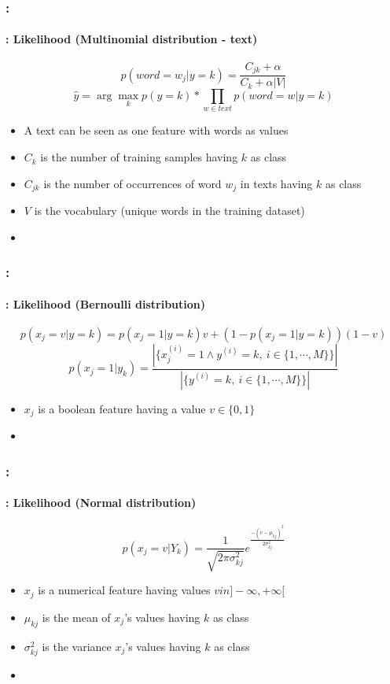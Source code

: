 \documentclass[xcolor=table]{beamer}
\begin{document}
\begin{frame}
	\frametitle{\insertshortsubtitle: \insertsection}
	\framesubtitle{\insertsubsection: Likelihood (Multinomial distribution - text)}
	
	\[p(word = w_j|y=k) = \frac{C_{jk} + \alpha}{C_k + \alpha |V|}\]
	\[\hat{y} = \arg\max_{k} p(y=k) * \prod_{w \in text} p(word = w|y=k)\]
	
	\begin{itemize}
		\item A text can be seen as one feature with words as values
		\item $C_k$ is the number of training samples having $k$ as class
		\item $C_{jk}$ is the number of occurrences of word $w_j$ in texts having $k$ as class
		\item $V$ is the vocabulary (unique words in the training dataset)
		\item {}
	\end{itemize}
	
\end{frame}

\begin{frame}
	\frametitle{\insertshortsubtitle: \insertsection}
	\framesubtitle{\insertsubsection: Likelihood (Bernoulli distribution)}
	
	\[p(x_j=v|y=k) = p(x_j=1|y=k) v + (1-p(x_j=1|y=k)) (1-v)\]
	\[p(x_j=1|y_k) = \frac{|\{x_j^{(i)} = 1 \wedge y^{(i)} = k,\ i \in \{1, \cdots, M\}\}|}{|\{y^{(i)} = k,\ i \in \{1, \cdots, M\}\}|}\]
	
	\begin{itemize}
		\item $x_j$ is a boolean feature having a value $v \in \{0, 1\}$
		\item {}
	\end{itemize}
	
	
\end{frame}

\begin{frame}
	\frametitle{\insertshortsubtitle: \insertsection}
	\framesubtitle{\insertsubsection: Likelihood (Normal distribution)}
	
	\[p(x_j = v|Y_k) = \frac{1}{\sqrt{2\pi \sigma_{kj}^2}} e^\frac{-(v-\mu_{kj})^2}{2 \sigma_{kj}^2}\]
	
	\begin{itemize}
		\item $x_j$ is a numerical feature having values $ v in ]-\infty, +\infty[ $
		\item $\mu_{kj}$ is the mean of $x_j$'s values having $k$ as class
		\item $\sigma_{kj}^2$ is the variance $x_j$'s values having $k$ as class
		\item {}
	\end{itemize}
	
	
\end{frame}
\end{document}
